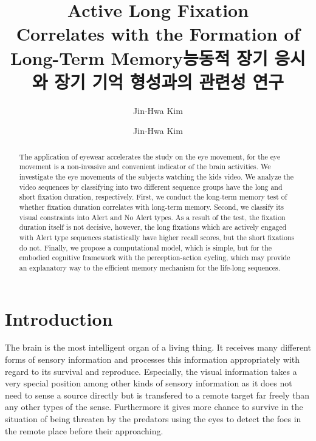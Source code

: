 \documentclass[oneside,master]{snueethesis}
\title{Active Long Fixation \\
Correlates with the Formation of \\
Long-Term Memory}
\title*{능동적 장기 응시와 장기 기억 형성과의 관련성 연구}
\author{Jin-Hwa Kim}
\author*{Jin-Hwa Kim} %
\begin{document}
\makefrontcover
\makefrontcover
\makeapproval

\cleardoublepage
{}

\begin{abstract}
\noindent

The application of eyewear accelerates the study on the eye movement, for the eye movement is a non-invasive and convenient indicator of the brain activities. We investigate the eye movements of the subjects watching the kids video. We analyze the video sequences by classifying into two different sequence groups have the long and short fixation duration, respectively. First, we conduct the long-term memory test of whether fixation duration correlates with long-term memory. Second, we classify its visual constraints into Alert and No Alert types. As a result of the test, the fixation duration itself is not decisive, however, the long fixations which are actively engaged with Alert type sequences statistically have higher recall scores, but the short fixations do not. Finally, we propose a computational model, which is simple, but for the embodied cognitive framework with the perception-action cycling, which may provide an explanatory way to the efficient memory mechanism for the life-long sequences.


\end{abstract}

\tableofcontents
\listoffigures
\listoftables

\cleardoublepage
{}

\chapter{Introduction}

The brain is the most intelligent organ of a living thing. It receives many different forms of sensory information and processes this information appropriately with regard to its survival and reproduce. Especially, the visual information takes a very special position among other kinds of sensory information as it does not need to sense a source directly but is transfered to a remote target far freely than any other types of the sense. Furthermore it gives more chance to survive in the situation of being threaten by the predators using the eyes to detect the foes in the remote place before their approaching. 
\end{document}
